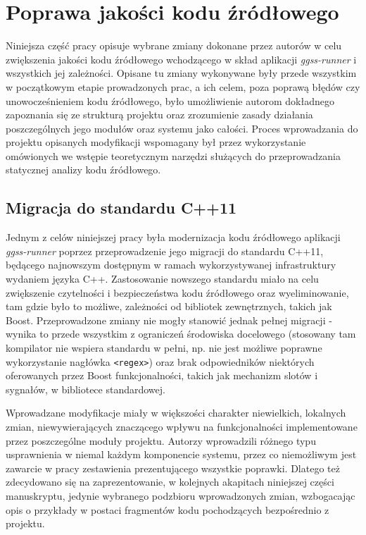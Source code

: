 \clearpage
\section{Poprawa jakości kodu źródłowego}
Niniejsza część pracy opisuje wybrane zmiany dokonane przez autorów w celu zwiększenia jakości kodu źródłowego wchodzącego w skład aplikacji \emph{ggss-runner} i wszystkich jej zależności. Opisane tu zmiany wykonywane były przede wszystkim w początkowym etapie prowadzonych prac, a ich celem, poza poprawą błędów czy unowocześnieniem kodu źródłowego, było umożliwienie autorom dokładnego zapoznania się ze strukturą projektu oraz zrozumienie zasady działania poszczególnych jego modułów oraz systemu jako całości. Proces wprowadzania do projektu opisanych modyfikacji wspomagany był przez wykorzystanie omówionych we wstępie teoretycznym narzędzi służących do przeprowadzania statycznej analizy kodu źródłowego. 

\subsection{Migracja do standardu C++11}
Jednym z celów niniejszej pracy była modernizacja kodu źródłowego aplikacji \emph{ggss-runner} poprzez przeprowadzenie jego migracji do standardu C++11, będącego najnowszym dostępnym w ramach wykorzystywanej infrastruktury wydaniem języka C++. Zastosowanie nowszego standardu miało na celu zwiększenie czytelności i bezpieczeństwa kodu źródłowego oraz wyeliminowanie, tam gdzie było to możliwe, zależności od bibliotek zewnętrznych, takich jak Boost. Przeprowadzone zmiany nie mogły stanowić jednak pełnej migracji - wynika to przede wszystkim z ograniczeń środowiska docelowego (stosowany tam kompilator nie wspiera standardu w pełni, np. nie jest możliwe poprawne wykorzystanie nagłówka \lstinline{<regex>}) oraz brak odpowiedników niektórych oferowanych przez Boost funkcjonalności, takich jak mechanizm slotów i sygnałów, w bibliotece standardowej.

Wprowadzane modyfikacje miały w większości charakter niewielkich, lokalnych zmian, niewywierających znaczącego wpływu na funkcjonalności implementowane przez poszczególne moduły projektu. Autorzy wprowadzili różnego typu usprawnienia w niemal każdym komponencie systemu, przez co niemożliwym jest zawarcie w pracy zestawienia prezentującego wszystkie poprawki. Dlatego też zdecydowano się na zaprezentowanie, w kolejnych akapitach niniejszej części manuskryptu, jedynie wybranego podzbioru wprowadzonych zmian, wzbogacając opis o przykłady w postaci fragmentów kodu pochodzących bezpośrednio z projektu. 

